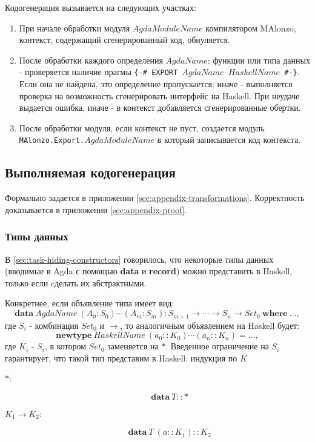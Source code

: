 Кодогенерация вызывается на следующих участках:
\begin{enumerate}
\item При начале обработки модуля \(AgdaModuleName\) компилятором MAlonzo,
      контекст, содержащий сгенерированный код, обнуляется.
\item После обработки каждого определения \(AgdaName\): функции или типа данных -
      проверяется наличие прагмы \texttt{\{-\# EXPORT \(AgdaName\) \(HaskellName\) \#-\}}.
      Если она не найдена, это определение пропускается; иначе - выполняется проверка
      на возможность сгенерировать интерфейс на Haskell. При неудаче выдается ошибка,
      иначе - в контекст добавляется сгенерированные обертки.
\item После обработки модуля, если контекст не пуст, создается модуль \texttt{MAlonzo.Export.\(AgdaModuleName\)}
      в который записывается код контекста.
\end{enumerate}

\subsection{Выполняемая кодогенерация}

Формально задается в приложении \ref{sec:appendix-transformations}.
Корректность доказывается в приложении \ref{sec:appendix-proof}.

\subsubsection{Типы данных}\label{sec:implementation-datatypes}

В \ref{sec:task-hiding-constructors} говорилось, что некоторые типы данных
(вводимые в Agda с помощью \textbf{data} и \textbf{record}) можно
представить в Haskell, только если cделать их абстрактными.

Конкретнее, если объявление типа имеет вид:
\[
\mathbf{data}\ AgdaName\ (A_0 : S_0) \cdots (A_m : S_m) :
S_{m+1} \rightarrow \cdots \rightarrow S_n \rightarrow Set_0\ \mathbf{where}\ \dots,
\]
где \(S_i\) - комбинация \(Set_0\) и \(\rightarrow\), то аналогичным объявлением
на Haskell будет:
\[
\mathbf{newtype}\ HaskellName\ (a_0 :: K_0) \cdots (a_n :: K_n) = \dots,
\]
где \(K_i\) - \(S_i\), в котором \(Set_0\) заменяется на \(*\).
Введенное ограничение на \(S_i\) гарантирует, что такой тип представим
в Haskell: индукция по \(K\)
\begin{description}
\item[\(*\): ]
\[
\mathbf{data}\ T :: *
\]
\item[\(K_1 \rightarrow K_2\): ]
\[
\mathbf{data}\ T\ (a :: K_1) :: K_2
\]
\end{description}

